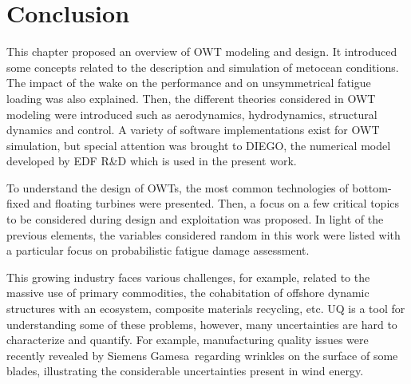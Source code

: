 \section{Conclusion}

This chapter proposed an overview of OWT modeling and design. 
It introduced some concepts related to the description and simulation of metocean conditions. 
The impact of the wake on the performance and on unsymmetrical fatigue loading was also explained.  
Then, the different theories considered in OWT modeling were introduced such as aerodynamics, hydrodynamics, structural dynamics and control. 
A variety of software implementations exist for OWT simulation, but special attention was brought to DIEGO, the numerical model developed by EDF R\&D which is used in the present work. 

To understand the design of OWTs, the most common technologies of bottom-fixed and floating turbines were presented. 
Then, a focus on a few critical topics to be considered during design and exploitation was proposed. 
In light of the previous elements, the variables considered random in this work were listed with a particular focus on probabilistic fatigue damage assessment.   

This growing industry faces various challenges, for example, related to the massive use of primary commodities, the cohabitation of offshore dynamic structures with an ecosystem, composite materials recycling, etc. 
UQ is a tool for understanding some of these problems, however, many uncertainties are hard to characterize and quantify. 
For example, manufacturing quality issues were recently revealed by Siemens Gamesa\footnotemark~regarding wrinkles on the surface of some blades, illustrating the considerable uncertainties present in wind energy. 



